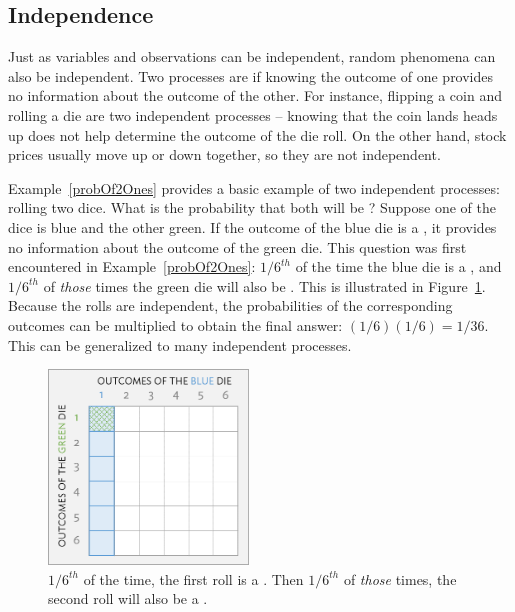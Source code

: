 \subsection{Independence}
\label{probabilityIndependence}

Just as variables and observations can be independent, random phenomena can also be independent. Two processes are  if knowing the outcome of one provides no information about the outcome of the other. For instance, flipping a coin and rolling a die are two independent processes -- knowing that the coin lands heads up does not help determine the outcome of the die roll. On the other hand, stock prices usually move up or down together, so they are not independent.

\textD{\newpage}

Example~\ref{probOf2Ones} provides a basic example of two independent processes: rolling two dice. What is the probability that both will be ? Suppose one of the dice is blue and the other green. If the outcome of the blue die is a , it provides no information about the outcome of the green die. This question was first encountered in Example~\ref{probOf2Ones}: $1/6^{th}$ of the time the blue die is a , and $1/6^{th}$ of \emph{those} times the green die will also be . This is illustrated in Figure~\ref{fig:indepForRollingTwo1s}. Because the rolls are independent, the probabilities of the corresponding outcomes can be multiplied to obtain the final answer: $(1/6)(1/6)=1/36$. This can be generalized to many independent processes. 

\begin{figure}[hht]
\centering
\includegraphics[width=0.475\textwidth]{ch_probability_oi_biostat/figures/indepForRollingTwo1s/indepForRollingTwo1s.png}
\caption{$1/6^{th}$ of the time, the first roll is a . Then $1/6^{th}$ of \emph{those} times, the second roll will also be a .}
\label{fig:indepForRollingTwo1s}
\end{figure}


